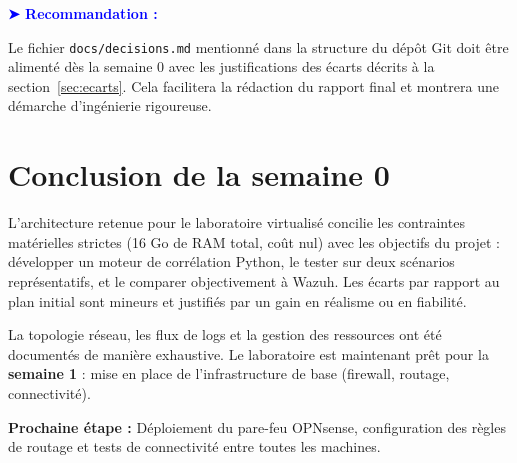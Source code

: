 \documentclass[12pt,a4paper]{article}
\newenvironment{recommandation}{
    \vspace{0.5em}
    \noindent\textbf{\textcolor{blue}{➤ Recommandation :}}\hspace{0.5em}
}{
    \vspace{0.5em}
}
\begin{document}
\begin{recommandation}
Le fichier \texttt{docs/decisions.md} mentionné dans la structure du dépôt Git doit être alimenté dès la semaine 0 avec les justifications des écarts décrits à la section~\ref{sec:ecarts}. Cela facilitera la rédaction du rapport final et montrera une démarche d'ingénierie rigoureuse.
\end{recommandation}

\section{Conclusion de la semaine 0}

L'architecture retenue pour le laboratoire virtualisé concilie les contraintes matérielles strictes (16 Go de RAM total, coût nul) avec les objectifs du projet : développer un moteur de corrélation Python, le tester sur deux scénarios représentatifs, et le comparer objectivement à Wazuh. Les écarts par rapport au plan initial sont mineurs et justifiés par un gain en réalisme ou en fiabilité.

La topologie réseau, les flux de logs et la gestion des ressources ont été documentés de manière exhaustive. Le laboratoire est maintenant prêt pour la \textbf{semaine 1} : mise en place de l'infrastructure de base (firewall, routage, connectivité).

\textbf{Prochaine étape :} Déploiement du pare-feu OPNsense, configuration des règles de routage et tests de connectivité entre toutes les machines.
\end{document}
